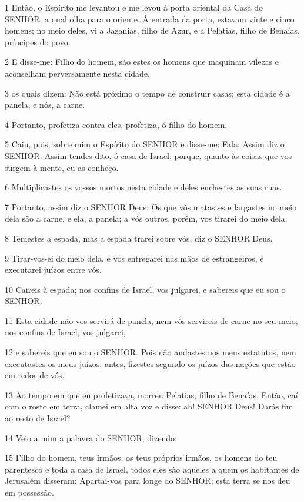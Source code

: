 \par 1 Então, o Espírito me levantou e me levou à porta oriental da Casa do SENHOR, a qual olha para o oriente. À entrada da porta, estavam vinte e cinco homens; no meio deles, vi a Jazanias, filho de Azur, e a Pelatias, filho de Benaías, príncipes do povo.
\par 2 E disse-me: Filho do homem, são estes os homens que maquinam vilezas e aconselham perversamente nesta cidade,
\par 3 os quais dizem: Não está próximo o tempo de construir casas; esta cidade é a panela, e nós, a carne.
\par 4 Portanto, profetiza contra eles, profetiza, ó filho do homem.
\par 5 Caiu, pois, sobre mim o Espírito do SENHOR e disse-me: Fala: Assim diz o SENHOR: Assim tendes dito, ó casa de Israel; porque, quanto às coisas que vos surgem à mente, eu as conheço.
\par 6 Multiplicastes os vossos mortos nesta cidade e deles enchestes as suas ruas.
\par 7 Portanto, assim diz o SENHOR Deus: Os que vós matastes e largastes no meio dela são a carne, e ela, a panela; a vós outros, porém, vos tirarei do meio dela.
\par 8 Temestes a espada, mas a espada trarei sobre vós, diz o SENHOR Deus.
\par 9 Tirar-vos-ei do meio dela, e vos entregarei nas mãos de estrangeiros, e executarei juízos entre vós.
\par 10 Caireis à espada; nos confins de Israel, vos julgarei, e sabereis que eu sou o SENHOR.
\par 11 Esta cidade não vos servirá de panela, nem vós servireis de carne no seu meio; nos confins de Israel, vos julgarei,
\par 12 e sabereis que eu sou o SENHOR. Pois não andastes nos meus estatutos, nem executastes os meus juízos; antes, fizestes segundo os juízos das nações que estão em redor de vós.
\par 13 Ao tempo em que eu profetizava, morreu Pelatias, filho de Benaías. Então, caí com o rosto em terra, clamei em alta voz e disse: ah! SENHOR Deus! Darás fim ao resto de Israel?
\par 14 Veio a mim a palavra do SENHOR, dizendo:
\par 15 Filho do homem, teus irmãos, os teus próprios irmãos, os homens do teu parentesco e toda a casa de Israel, todos eles são aqueles a quem os habitantes de Jerusalém disseram: Apartai-vos para longe do SENHOR; esta terra se nos deu em possessão.
